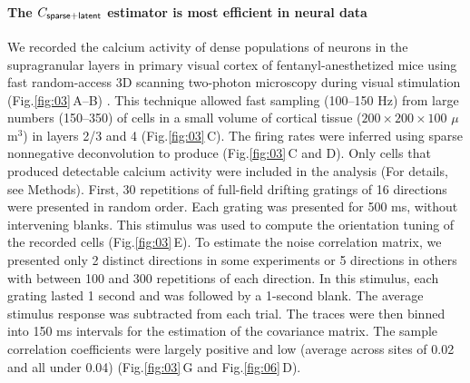 \documentclass[10pt]{article}
\newcommand{\figref}[2]{Fig.\;\ref{fig:#1}\,#2}
\begin{document}
\paragraph{The $C_{\sf sparse+latent}$ estimator is most efficient in neural data}
We recorded the calcium activity of dense populations of neurons in the supragranular layers in primary visual cortex of fentanyl-anesthetized mice using fast random-access 3D scanning two-photon microscopy during visual stimulation (\figref{03}{A--B}) \cite{Reddy:2005, Katona:2012, Cotton:2013}. This technique allowed fast sampling (100--150 Hz) from large numbers (150--350) of cells in a small volume of cortical tissue ($200\times200\times100$ $\mu$m$^3$) in layers 2/3 and 4 (\figref{03}{C}).  The firing rates were inferred using sparse nonnegative deconvolution \cite{Vogelstein:2010} to produce (\figref{03}{C and D}). Only cells that produced detectable calcium activity were included in the analysis (For details, see Methods).  First, 30 repetitions of full-field drifting gratings of 16 directions were presented in random order.  Each grating was presented for 500 ms, without intervening blanks.  This stimulus was used to compute the orientation tuning of the recorded cells (\figref{03}{E}). To estimate the noise correlation matrix, we presented only 2 distinct directions in some experiments or 5 directions in others with between 100 and 300 repetitions of each direction. In this stimulus, each grating lasted 1 second and was followed by a 1-second blank.  The average stimulus response was subtracted from each trial. The traces were then binned into 150 ms intervals for the estimation of the covariance matrix.   The sample correlation coefficients were largely positive and low (average across sites of 0.02 and all under 0.04) (\figref{03}{G} and \figref{06}{D}).  
\end{document}
